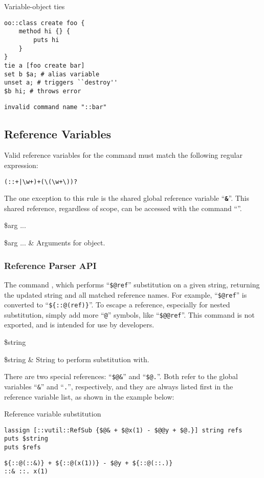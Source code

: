 \documentclass{article}
\begin{document}
\begin{example}{Variable-object ties}
\begin{lstlisting}
oo::class create foo {
    method hi {} {
        puts hi
    }
}
tie a [foo create bar]
set b $a; # alias variable
unset a; # triggers ``destroy''
$b hi; # throws error
\end{lstlisting}
\tcblower
\begin{lstlisting}
invalid command name "::bar"
\end{lstlisting}
\end{example}
\clearpage
\subsection{Reference Variables}
Valid reference variables for the  command must match the following regular expression:
\begin{lstlisting}
(::+|\w+)+(\(\w+\))?
\end{lstlisting}
The one exception to this rule is the shared global reference variable ``\textbf{\texttt{\&}}''.
This shared reference, regardless of scope, can be accessed with the command ``\textbf{\texttt{\cmdlink{\$\&}}}''.
\begin{syntax}
\command{\$\&} \$arg ...
\end{syntax}
\begin{args}
\$arg ... & Arguments for object.
\end{args}

\subsubsection{Reference Parser API}
The command , which performs ``\texttt{\$@ref}'' substitution on a given string, returning the updated string and all matched reference names. 
For example, ``\texttt{\$@ref}'' is converted to ``\texttt{\$\{::@(ref)\}}''.
To escape a reference, especially for nested substitution, simply add more ``\texttt{@}'' symbols, like ``\texttt{\$@@ref}''.
This command is not exported, and is intended for use by developers.
\begin{syntax}
 \$string
\end{syntax}
\begin{args}
\$string & String to perform substitution with.
\end{args}

There are two special references: ``\texttt{\$@\&}'' and ``\texttt{\$@.}''. Both refer to the global variables ``\texttt{\&}'' and ``\texttt{.}'', respectively, and they are always listed first in the reference variable list, as shown in the example below:
\begin{example}{Reference variable substitution}
\begin{lstlisting}
lassign [::vutil::RefSub {$@& + $@x(1) - $@@y + $@.}] string refs
puts $string
puts $refs
\end{lstlisting}
\tcblower
\begin{lstlisting}
${::@(::&)} + ${::@(x(1))} - $@y + ${::@(::.)}
::& ::. x(1)
\end{lstlisting}
\end{example}
\end{document}
